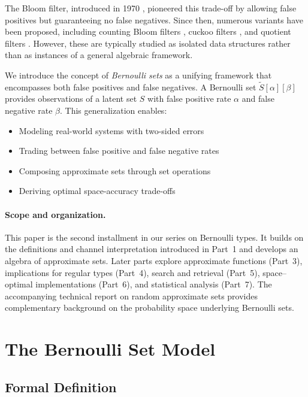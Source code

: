 \documentclass[11pt,final,hidelinks]{article}
\newcommand{\obs}[1]{\widetilde{#1}}  %
\newcommand{\fprate}{\alpha}
\newcommand{\fnrate}{\beta}
\begin{document}
The Bloom filter, introduced in 1970 \cite{bloom1970}, pioneered this trade-off by allowing false positives but guaranteeing no false negatives. Since then, numerous variants have been proposed, including counting Bloom filters \cite{fan2000}, cuckoo filters \cite{fan2014}, and quotient filters \cite{bender2012}. However, these are typically studied as isolated data structures rather than as instances of a general algebraic framework.

We introduce the concept of \emph{Bernoulli sets} as a unifying framework that encompasses both false positives and false negatives. A Bernoulli set $\obs{S}[\fprate][\fnrate]$ provides observations of a latent set $S$ with false positive rate $\fprate$ and false negative rate $\fnrate$. This generalization enables:

\begin{itemize}
    \item Modeling real-world systems with two-sided errors
    \item Trading between false positive and false negative rates
    \item Composing approximate sets through set operations
    \item Deriving optimal space-accuracy trade-offs
\end{itemize}

\paragraph{Scope and organization.}  This paper is the second installment in our series on Bernoulli types.  It builds on the definitions and channel interpretation introduced in Part~1 and develops an algebra of approximate sets.  Later parts explore approximate functions (Part~3), implications for regular types (Part~4), search and retrieval (Part~5), space–optimal implementations (Part~6), and statistical analysis (Part~7).  The accompanying technical report on random approximate sets provides complementary background on the probability space underlying Bernoulli sets.

\section{The Bernoulli Set Model}

\subsection{Formal Definition}
\end{document}

